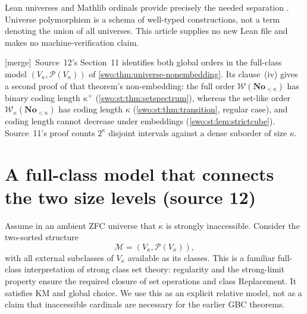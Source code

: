 \documentclass[11pt]{article}
\theoremstyle{definition}
\theoremstyle{remark}
\newcommand{\No}{\mathbf{No}}
\newcommand{\WO}{\mathcal W}
\newcommand{\merge}{\textsf{[merge]}}
\begin{document}
Lean universes and Mathlib ordinals provide precisely the
needed separation \cite{LeanUniverses,MathlibOrdinal}. Universe
polymorphism is a schema of well-typed constructions, not a
term denoting the union of all universes. This article supplies
no new Lean file and makes no machine-verification claim.


\merge\ Source~12's Section~11 identifies both global orders in the full-class
model $(V_\kappa,\mathcal P(V_\kappa))$ of \cref{swo:thm:universe-nonembedding}.
Its clause~(iv) gives a second proof of that theorem's non-embedding: the full
order $\WO(\No_{<\kappa})$ has binary coding length $\kappa^+$
(\cref{swo:st:thm:setspectrum}), whereas the set-like order
$\WO_\kappa(\No_{<\kappa})$ has coding length $\kappa$
(\cref{swo:st:thm:transition}, regular case), and coding length cannot
decrease under embeddings (\cref{swo:st:lem:strictcube}). Source~11's proof
counts $2^\kappa$ disjoint intervals against a dense suborder of size
$\kappa$.

\section{A full-class model that connects the two size levels (source 12)}
\label{swo:st:sec:model}

Assume in an ambient ZFC universe that $\kappa$ is strongly inaccessible.
Consider the two-sorted structure
\[
 \mathcal M=(V_\kappa,\mathcal P(V_\kappa)),
\]
with all external subclasses of $V_\kappa$ available as its classes.
This is a familiar full-class interpretation of strong class set theory:
regularity and the strong-limit property ensure the required closure of
set operations and class Replacement. It satisfies KM and global choice.
We use this as an explicit relative model, not as a claim that inaccessible
cardinals are necessary for the earlier GBC theorems.
\end{document}
